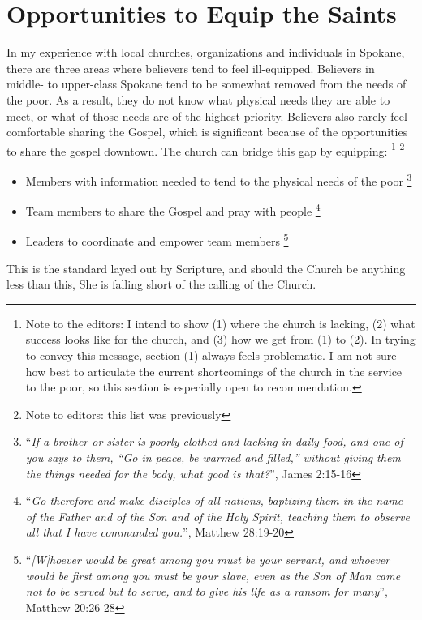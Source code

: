 \documentclass[12pt]{article}
\begin{document}
\section{Opportunities to Equip the Saints}

    In my experience with local churches, organizations and individuals in Spokane, there are three areas where believers tend to feel ill-equipped.
    Believers in middle- to upper-class Spokane tend to be somewhat removed from the needs of the poor.
    As a result, they do not know what physical needs they are able to meet, or what of those needs are of the highest priority.
    Believers also rarely feel comfortable sharing the Gospel, which is significant because of the opportunities to share the gospel downtown.
    The church can bridge this gap by equipping:
    \footnote{Note to the editors: I intend to show (1) where the church is lacking, (2) what success looks like for the church, and (3) how we get from (1) to (2).
    In trying to convey this message, section (1) always feels problematic.
    I am not sure how best to articulate the current shortcomings of the church in the service to the poor, so this section is especially open to recommendation.}
    \footnote{Note to editors: this list was previously }
    \begin{itemize}
        \item Members with information needed to tend to the physical needs of the poor
          \footnote{``\textit{If a brother or sister is poorly clothed and lacking in daily food, and one of you says to them, “Go in peace, be warmed and filled,” without giving them the things needed for the body, what good is that?}'', James 2:15-16}
        \item Team members to share the Gospel and pray with people
          \footnote{``\textit{Go therefore and make disciples of all nations, baptizing them in the name of the Father and of the Son and of the Holy Spirit, teaching them to observe all that I have commanded you.}'', Matthew 28:19-20}
        \item Leaders to coordinate and empower team members
          \footnote{``\textit{[W]hoever would be great among you must be your servant, and whoever would be first among you must be your slave, even as the Son of Man came not to be served but to serve, and to give his life as a ransom for many}'', Matthew 20:26-28}
    \end{itemize}
    This is the standard layed out by Scripture, and should the Church be anything less than this, She is falling short of the calling of the Church.
\end{document}
